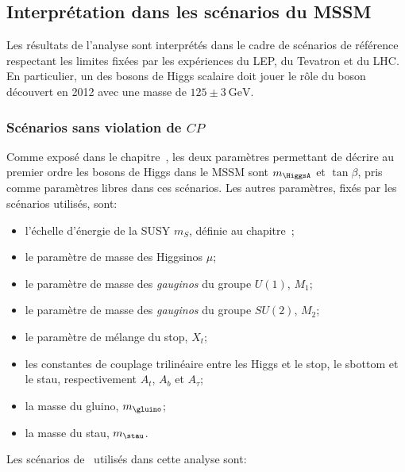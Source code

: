 \subsection{Interprétation dans les scénarios du MSSM}\label{chapter-HTT_analysis-section-signal_extraction-benchmarks}
Les résultats de l'analyse sont interprétés dans le cadre de scénarios de référence~\cite{Bagnaschi_2019}
respectant les limites fixées par les expériences du LEP, du Tevatron et du LHC.
En particulier, un des bosons de Higgs scalaire doit jouer le rôle du boson découvert en 2012 avec une masse de $\num{125}\pm\SI{3}{\GeV}$.
\subsubsection{Scénarios sans violation de $CP$}
Comme exposé dans le chapitre~,
les deux paramètres permettant de décrire au premier ordre les bosons de Higgs dans le MSSM
sont $m_{\HiggsA}$ et $\tan\beta$,
pris comme paramètres libres dans ces scénarios.
Les autres paramètres, fixés par les scénarios utilisés, sont:
\begin{itemize}
\item l'échelle d'énergie de la SUSY $m_S$, définie au chapitre~;
\item le paramètre de masse des Higgsinos $\mu$;
\item le paramètre de masse des \emph{gauginos} du groupe $U(1)$, $M_1$;
\item le paramètre de masse des \emph{gauginos} du groupe $SU(2)$, $M_2$;
\item le paramètre de mélange du stop, $X_t$;
\item les constantes de couplage trilinéaire entre les Higgs et le stop, le sbottom et le stau, respectivement $A_t$, $A_b$ et $A_\tau$;
\item la masse du gluino, $m_{\gluino}$;
\item la masse du stau, $m_{\stau}$.
\end{itemize}
\par
Les scénarios de~\cite{Bagnaschi_2019} utilisés dans cette analyse sont:

%

